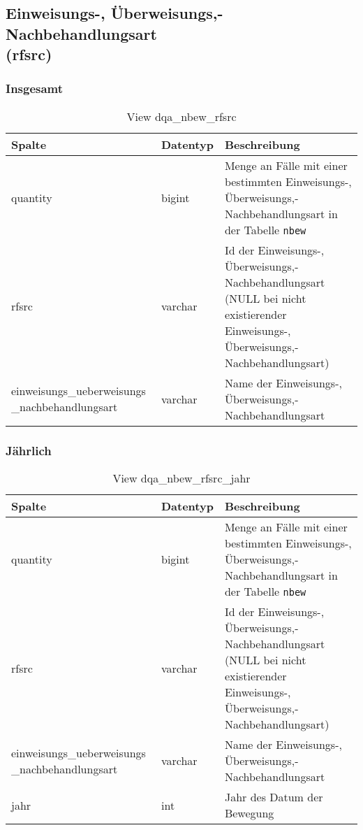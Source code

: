 \subsection{Einweisungs-, Überweisungs,- Nachbehandlungsart \\ (rfsrc)} \label{subsec:bewRfsrc}

\subsubsection{Insgesamt} \label{subsubsec:bewRfsrcI}

\begin{table}[ht]
	\centering   
	\caption{View dqa\_nbew\_rfsrc}
	\label{tab:bewRfsrcI}
	\begin{tabular}{||p{5cm}|l|p{8cm}||}   		
		\hline
		Spalte & Datentyp & Beschreibung \\ [0.5ex]
		\hline\hline
		quantity & bigint & Menge an Fälle mit einer bestimmten Einweisungs-, Überweisungs,- Nachbehandlungsart in der Tabelle \texttt{nbew} \\
		\hline
		rfsrc & varchar & Id der Einweisungs-, Überweisungs,- Nachbehandlungsart (NULL bei nicht existierender Einweisungs-, Überweisungs,- Nachbehandlungsart)\\
		\hline
		einweisungs\_ueberweisungs \_nachbehandlungsart & varchar & Name der Einweisungs-, Überweisungs,- Nachbehandlungsart \\
		\hline
	\end{tabular}
\end{table}

\subsubsection{Jährlich} \label{subsubsec:bewRfsrcJ}

\begin{table}[ht]
	\centering   
	\caption{View dqa\_nbew\_rfsrc\_jahr}
	\label{tab:bewRfsrcJ}
	\begin{tabular}{||p{5cm}|l|p{8cm}||}   		
		\hline
		Spalte & Datentyp & Beschreibung \\ [0.5ex]
		\hline\hline
		quantity & bigint & Menge an Fälle mit einer bestimmten Einweisungs-, Überweisungs,- Nachbehandlungsart in der Tabelle \texttt{nbew}\\
		\hline
		rfsrc & varchar & Id der Einweisungs-, Überweisungs,- Nachbehandlungsart (NULL bei nicht existierender Einweisungs-, Überweisungs,- Nachbehandlungsart)\\
		\hline
		einweisungs\_ueberweisungs \_nachbehandlungsart & varchar & Name der Einweisungs-, Überweisungs,- Nachbehandlungsart \\
		\hline
		jahr & int &  Jahr des Datum der Bewegung \\
		\hline		
	\end{tabular}
\end{table}

